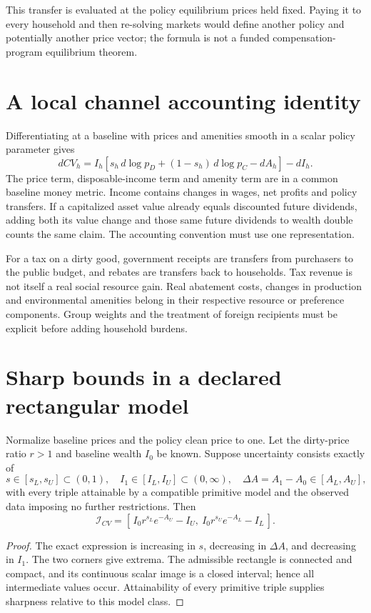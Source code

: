 \documentclass[11pt]{article}
\begin{document}
This transfer is evaluated at the policy equilibrium prices held fixed. Paying it to every household and then re-solving markets would define another policy and potentially another price vector; the formula is not a funded compensation-program equilibrium theorem.

\section*{A local channel accounting identity}
Differentiating at a baseline with prices and amenities smooth in a scalar policy parameter gives
\[
 dCV_h=I_h[s_h\,d\log p_D+(1-s_h)\,d\log p_C-dA_h]-dI_h.
\]
The price term, disposable-income term and amenity term are in a common baseline money metric. Income contains changes in wages, net profits and policy transfers. If a capitalized asset value already equals discounted future dividends, adding both its value change and those same future dividends to wealth double counts the same claim. The accounting convention must use one representation.

For a tax on a dirty good, government receipts are transfers from purchasers to the public budget, and rebates are transfers back to households. Tax revenue is not itself a real social resource gain. Real abatement costs, changes in production and environmental amenities belong in their respective resource or preference components. Group weights and the treatment of foreign recipients must be explicit before adding household burdens.

\section*{Sharp bounds in a declared rectangular model}
Normalize baseline prices and the policy clean price to one. Let the dirty-price ratio $r>1$ and baseline wealth $I_0$ be known. Suppose uncertainty consists exactly of
\[
 s\in[s_L,s_U]\subset(0,1),\quad
 I_1\in[I_L,I_U]\subset(0,\infty),\quad
 \Delta A=A_1-A_0\in[A_L,A_U],
\]
with every triple attainable by a compatible primitive model and the observed data imposing no further restrictions. Then
\[
 \mathcal I_{CV}=
 [\,I_0r^{s_L}e^{-A_U}-I_U,\ 
    I_0r^{s_U}e^{-A_L}-I_L\,].
\]
\begin{proof}
The exact expression is increasing in $s$, decreasing in $\Delta A$, and decreasing in $I_1$. The two corners give extrema. The admissible rectangle is connected and compact, and its continuous scalar image is a closed interval; hence all intermediate values occur. Attainability of every primitive triple supplies sharpness relative to this model class.
\end{proof}
\end{document}
